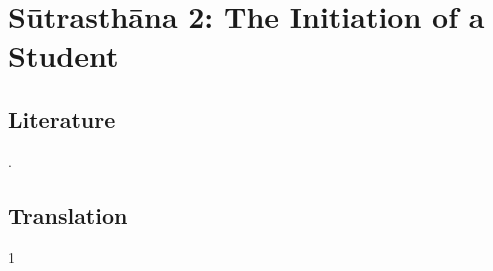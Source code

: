 
\chapter{Sūtrasthāna 2: The Initiation of a Student}


\section{Literature}
\cites[IA, 204]{meul-hist}{prei-2007}[82--83, \emph{et passim}]{wujad-2012}. 

\section{Translation}

\begin{translation}    
    \item [1] 
    
\end{translation}



